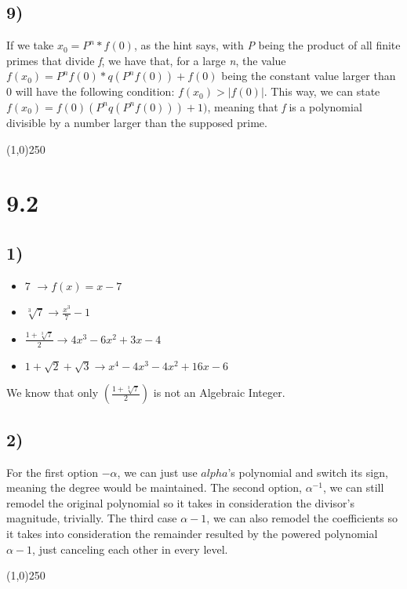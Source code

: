 \documentclass[11pt]{article}
\begin{document}
\subsection*{9)}
\label{sec:orgd2b75aa}
If we take \(x_0 = P^n*f(0)\), as the hint says, with \emph{P} being the product of all finite primes that divide \emph{f}, we have that, for a large \emph{n}, the value \(f(x_0) = P^nf(0)*q(P^nf(0)) + f(0)\) being the constant value larger than 0 will have the following condition: \(f(x_0) > |f(0)|\). This way, we can state \(f(x_0) = f(0)(P^nq(P^nf(0))) + 1)\), meaning that \emph{f} is a polynomial divisible by a number larger than the supposed prime.

\begin{center}
\line(1,0){250}
\end{center}

\section*{9.2}
\label{sec:org02cf9e3}
\subsection*{1)}
\label{sec:org2297dd7}
\begin{itemize}
\item 7 \(\to f(x) = x - 7\)
\item \(\sqrt[3]7 \to \frac{x^3}{7}- 1\)
\item \(\frac{1 + \sqrt[3]7}{2} \to 4x^3 - 6x^2 + 3x - 4\)
\item \(1 + \sqrt2 + \sqrt3 \to x^4 - 4x^3 - 4x^2 + 16x - 6\)
\end{itemize}
We know that only \((\frac{1 + \sqrt[3]7}{2})\) is not an Algebraic Integer.
\subsection*{2)}
\label{sec:orgd566c58}
For the first option \(-\alpha\), we can just use \(alpha\)'s polynomial and switch its sign, meaning the degree would be maintained. The second option, \(\alpha^{-1}\), we can still remodel the original polynomial so it takes in consideration the divisor's magnitude, trivially. The third case \(\alpha - 1\), we can also remodel the coefficients so it takes into consideration the remainder resulted by the powered polynomial \(\alpha - 1\), just canceling each other in every level. 

\begin{center}
\line(1,0){250}
\end{center}
\end{document}
